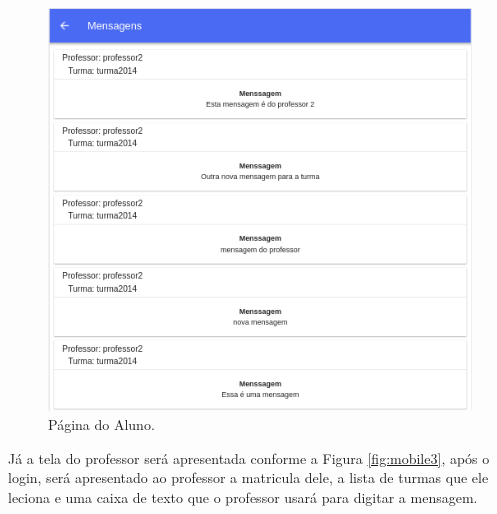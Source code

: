 \begin{figure}[H]
\centering
\includegraphics[scale=0.6]{figuras/mobile3}
\caption{Página do Aluno.}
\label{fig:mobile2}
\end{figure}

Já a tela do professor será apresentada conforme a Figura \ref{fig:mobile3}, após o login, será apresentado ao professor a matricula dele, a lista de turmas que ele leciona e uma caixa de texto que o professor usará para digitar a mensagem.


